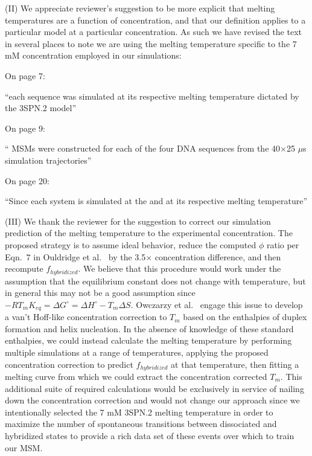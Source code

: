 \documentclass[11pt,a4paper]{letter} %
\newcommand*{\roodr}[1]{{\color{red}{#1}}}
\begin{document}
(II) We appreciate reviewer's suggestion to be more explicit that melting temperatures are a function of concentration, and that our definition applies to a particular model at a particular concentration. As such we have revised the text in several places to note we are using the melting temperature specific to the 7 mM concentration employed in our simulations:

On page 7:

``each sequence was simulated at its respective melting temperature \roodr{at 7mM concentration as} dictated by the 3SPN.2 model''

On page 9:

`` MSMs were constructed for each of the four DNA sequences \roodr{at their respective 3SPN.2 melting temperatures at 7 mM concentration} from the 40$\times$25 $\mu$s simulation trajectories''

On page 20:

``Since each system is simulated at the \roodr{same 7 mM concentration} and at its respective melting temperature''

(III) We thank the reviewer for the suggestion to correct our simulation prediction of the melting temperature to the experimental concentration. The proposed strategy is to assume ideal behavior, reduce the computed $\phi$ ratio per Eqn.~7 in Ouldridge et al.\ \cite{Ouldridge2010ExtractingSimulations} by the 3.5$\times$ concentration difference, and then recompute $f_{hybridized}$. We believe that this procedure would work under the assumption that the equilibrium constant does not change with temperature, but in general this may not be a good assumption since $-R T_m K_{eq} = \Delta G^\circ = \Delta H^\circ - T_m \Delta S$. Owczarzy et al.\ \cite{Owczarzy1997predicting} engage this issue to develop a van't Hoff-like concentration correction to $T_m$ based on the enthalpies of duplex formation and helix nucleation. In the absence of knowledge of these standard enthalpies, we could instead calculate the melting temperature by performing multiple simulations at a range of temperatures, applying the proposed concentration correction to predict $f_{hybridized}$ at that temperature, then fitting a melting curve from which we could extract the concentration corrected $T_m$. This additional suite of required calculations would be exclusively in service of nailing down the concentration correction and would not change our approach since we intentionally selected the 7 mM 3SPN.2 melting temperature in order to maximize the number of spontaneous transitions between dissociated and hybridized states to provide a rich data set of these events over which to train our MSM. 
\end{document}

